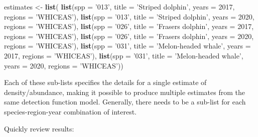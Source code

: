 \documentclass[
]{book}
\newenvironment{Shaded}{\begin{snugshade}}{\end{snugshade}}
\newcommand{\DataTypeTok}[1]{\textcolor[rgb]{0.13,0.29,0.53}{#1}}
\newcommand{\DecValTok}[1]{\textcolor[rgb]{0.00,0.00,0.81}{#1}}
\newcommand{\KeywordTok}[1]{\textcolor[rgb]{0.13,0.29,0.53}{\textbf{#1}}}
\newcommand{\NormalTok}[1]{#1}
\newcommand{\StringTok}[1]{\textcolor[rgb]{0.31,0.60,0.02}{#1}}
\begin{document}
\begin{Shaded}
\begin{Highlighting}[]
\NormalTok{estimates <-}\StringTok{ }\KeywordTok{list}\NormalTok{(}
    \KeywordTok{list}\NormalTok{(}\DataTypeTok{spp =} \StringTok{'013'}\NormalTok{,}
         \DataTypeTok{title =} \StringTok{'Striped dolphin'}\NormalTok{,}
         \DataTypeTok{years =} \DecValTok{2017}\NormalTok{,}
         \DataTypeTok{regions =} \StringTok{'WHICEAS'}\NormalTok{),}
    \KeywordTok{list}\NormalTok{(}\DataTypeTok{spp =} \StringTok{'013'}\NormalTok{,}
         \DataTypeTok{title =} \StringTok{'Striped dolphin'}\NormalTok{,}
         \DataTypeTok{years =} \DecValTok{2020}\NormalTok{,}
         \DataTypeTok{regions =} \StringTok{'WHICEAS'}\NormalTok{),}
    \KeywordTok{list}\NormalTok{(}\DataTypeTok{spp =} \StringTok{'026'}\NormalTok{,}
         \DataTypeTok{title =} \StringTok{'Frasers dolphin'}\NormalTok{,}
         \DataTypeTok{years =} \DecValTok{2017}\NormalTok{,}
         \DataTypeTok{regions =} \StringTok{'WHICEAS'}\NormalTok{),}
    \KeywordTok{list}\NormalTok{(}\DataTypeTok{spp =} \StringTok{'026'}\NormalTok{,}
         \DataTypeTok{title =} \StringTok{'Frasers dolphin'}\NormalTok{,}
         \DataTypeTok{years =} \DecValTok{2020}\NormalTok{,}
         \DataTypeTok{regions =} \StringTok{'WHICEAS'}\NormalTok{),}
    \KeywordTok{list}\NormalTok{(}\DataTypeTok{spp =} \StringTok{'031'}\NormalTok{,}
         \DataTypeTok{title =} \StringTok{'Melon-headed whale'}\NormalTok{,}
         \DataTypeTok{years =} \DecValTok{2017}\NormalTok{,}
         \DataTypeTok{regions =} \StringTok{'WHICEAS'}\NormalTok{),}
    \KeywordTok{list}\NormalTok{(}\DataTypeTok{spp =} \StringTok{'031'}\NormalTok{,}
         \DataTypeTok{title =} \StringTok{'Melon-headed whale'}\NormalTok{,}
         \DataTypeTok{years =} \DecValTok{2020}\NormalTok{,}
         \DataTypeTok{regions =} \StringTok{'WHICEAS'}\NormalTok{))}
\end{Highlighting}
\end{Shaded}

Each of these sub-lists specifies the details for a single estimate of density/abundance, making it possible to produce multiple estimates from the same detection function model. Generally, there needs to be a sub-list for each species-region-year combination of interest.

Quickly review results:
\end{document}
